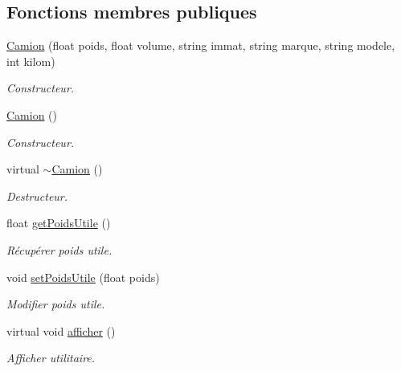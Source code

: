 \subsection*{Fonctions membres publiques}
\begin{DoxyCompactItemize}
\item 
\hyperlink{class_camion_aa3d47c07926da939f321faad61cbcf9c}{Camion} (float poids, float volume, string immat, string marque, string modele, int kilom)
\begin{DoxyCompactList}\small\item\em Constructeur. \item\end{DoxyCompactList}\item 
\hyperlink{class_camion_a5eb698c16331e4fab2ba2cbfebbea8a4}{Camion} ()
\begin{DoxyCompactList}\small\item\em Constructeur. \item\end{DoxyCompactList}\item 
virtual \hyperlink{class_camion_abd045aad98d33e8e353dcf1a6a7832c7}{$\sim$Camion} ()
\begin{DoxyCompactList}\small\item\em Destructeur. \item\end{DoxyCompactList}\item 
float \hyperlink{class_camion_a5eb44123d320dec356d4d335a60b7f28}{getPoidsUtile} ()
\begin{DoxyCompactList}\small\item\em Récupérer poids utile. \item\end{DoxyCompactList}\item 
void \hyperlink{class_camion_a3fe83aa0652ec440e915d983ac46f7d7}{setPoidsUtile} (float poids)
\begin{DoxyCompactList}\small\item\em Modifier poids utile. \item\end{DoxyCompactList}\item 
virtual void \hyperlink{class_camion_a1b7d9e844a03b1a1e7143a7618911157}{afficher} ()
\begin{DoxyCompactList}\small\item\em Afficher utilitaire. \item\end{DoxyCompactList}\end{DoxyCompactItemize}


